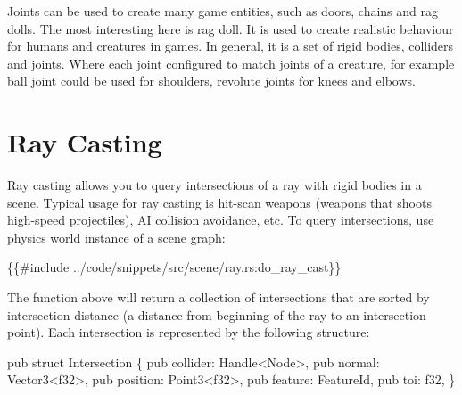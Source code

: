\documentclass[
]{book}
\newenvironment{Shaded}{\begin{snugshade}}{\end{snugshade}}
\newcommand{\NormalTok}[1]{#1}
\theoremstyle{definition}
\theoremstyle{definition}
\theoremstyle{definition}
\theoremstyle{definition}
\theoremstyle{remark}
\begin{document}
Joints can be used to create many game entities, such as doors, chains and rag dolls. The most interesting here is rag doll. It is used to create realistic behaviour for humans and creatures in games. In general, it is a set of rigid bodies, colliders and joints. Where each joint configured to match joints of a creature, for example ball joint could be used for shoulders, revolute joints for knees and elbows.

\section{Ray Casting}\label{ray-casting}

Ray casting allows you to query intersections of a ray with rigid bodies in a scene. Typical usage for ray casting is hit-scan weapons (weapons that shoots high-speed projectiles), AI collision avoidance, etc. To query intersections, use physics world instance of a scene graph:

\begin{Shaded}
\begin{Highlighting}[]
\NormalTok{\{\{\#include ../code/snippets/src/scene/ray.rs:do\_ray\_cast\}\}}
\end{Highlighting}
\end{Shaded}

The function above will return a collection of intersections that are sorted by intersection distance (a distance from beginning of the ray to an intersection point). Each intersection is represented by the following structure:

\begin{Shaded}
\begin{Highlighting}[]
\NormalTok{pub struct Intersection \{}
\NormalTok{    pub collider: Handle\textless{}Node\textgreater{},}
\NormalTok{    pub normal: Vector3\textless{}f32\textgreater{},}
\NormalTok{    pub position: Point3\textless{}f32\textgreater{},}
\NormalTok{    pub feature: FeatureId,}
\NormalTok{    pub toi: f32,}
\NormalTok{\}}
\end{Highlighting}
\end{Shaded}
\end{document}
